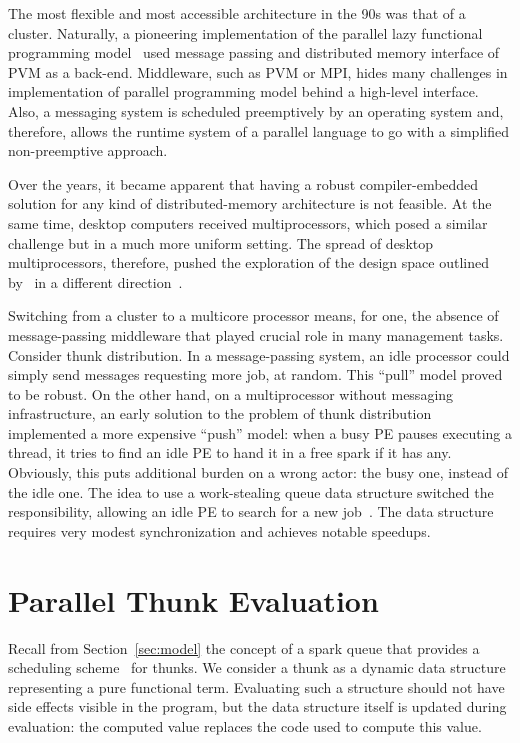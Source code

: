 \documentclass[11pt]{extarticle}
\begin{document}
The most flexible and most accessible architecture in the 90s was that of a cluster. Naturally, a pioneering implementation of the parallel lazy functional programming model~\cite{Trinder96} used message passing and distributed memory interface of PVM as a back-end. Middleware, such as PVM or MPI, hides many challenges in implementation of parallel programming model behind a high-level interface. Also, a messaging system is scheduled preemptively by an operating system and, therefore, allows the runtime system of a parallel language to go with a simplified non-preemptive approach.

Over the years, it became apparent that having a robust  compiler-embedded solution for any kind of distributed-memory architecture is not feasible. At the same time, desktop computers received multiprocessors, which posed a similar challenge but in a much more uniform setting. The spread of desktop multiprocessors, therefore, pushed the exploration of the design space outlined by~\cite{Trinder96} in a different direction~\cite{Harris05}. 

Switching from a cluster to a multicore processor means, for one, the absence of message-passing middleware that played crucial role in many management tasks. Consider thunk distribution. In a message-passing system, an idle processor could simply send messages requesting more job, at random. This ``pull'' model proved to be robust. On the other hand, on a multiprocessor without messaging infrastructure, an early solution to the problem of thunk distribution implemented a more expensive ``push'' model: when a busy PE pauses executing a thread, it tries to find an idle PE to hand it in a free spark if it has any. Obviously, this puts additional burden on a wrong actor: the busy one, instead of the idle one. The idea to use a work-stealing queue data structure switched the responsibility, allowing an idle PE to search for a new job~\cite{Marlow09}. The data structure requires very modest synchronization and achieves notable speedups. 

\section{Parallel Thunk Evaluation}\label{sec:thunk-eval}

Recall from Section~\ref{sec:model} the concept of a spark queue that provides a scheduling scheme~\cite{Trinder96} for thunks.
We consider a thunk as a dynamic data structure representing a pure functional term. Evaluating such a structure should not have side effects visible in the program, but the data structure itself is updated during evaluation: the computed value replaces the code used to compute this value.
\end{document}
